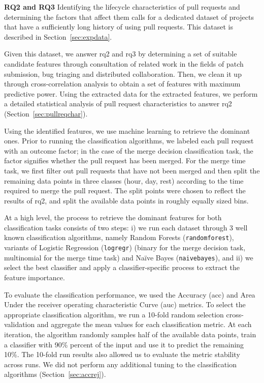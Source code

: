 \documentclass{sig-alternate}
\begin{document}
{\bfseries RQ2 and RQ3}
Identifying the lifecycle characteristics of pull requests and determining the
factors that affect them calls for a dedicated dataset of projects that have a
sufficiently long history of using pull requests. This dataset is described in
Section~\ref{sec:expdata}.

Given this dataset, we answer {\sc rq2} and {\sc rq3} by determining a set of
suitable candidate features through consultation of related work in the fields
of patch submission, bug triaging and distributed collaboration. Then, we clean
it up through cross-correlation analysis to obtain a set of features with
maximum predictive power. Using the extracted data for the extracted features,
we perform a detailed statistical analysis of pull request characteristics to
answer {\sc rq2} (Section~\ref{sec:pullreqchar}).

Using the identified features, we use machine learning to retrieve
the dominant ones. Prior to running the classification algorithms, we labeled
each pull request with an outcome factor; in the case of the \textsf{merge
decision} classification task, the factor signifies whether the pull request
has been merged. For the \textsf{merge time} task, we first filter out pull
requests that have not been merged and then split the remaining data points in
three classes (\textsf{hour}, \textsf{day}, \textsf{rest}) according to the time 
required to merge the pull request. The split points were chosen to reflect the
results of {\sc rq2}, and split the available data points in roughly
equally sized bins.

At a high level, the process to retrieve the dominant features for both
classification tasks consists of two steps: i) we run each dataset through 3
well known classification algorithms, namely Random Forests
(\texttt{randomforest}), variants of Logistic Regression (\texttt{logregr})
(binary for the \textsf{merge decision} task, multinomial for the \textsf{merge
time} task) and Na\"ive Bayes (\texttt{naivebayes}), and ii) we select the best
classifier and apply a classifier-specific process to extract the feature
importance. 

To evaluate the classification performance, we used the Accuracy ({\sc acc}) and
Area Under the receiver operating characteristic Curve ({\sc auc}) metrics. To
select the appropriate classification algorithm, we run a 10-fold random
selection cross-validation and aggregate the mean values for each classification
metric. At each iteration, the algorithm randomly samples half of the
available data points, train a classifier with 90\% percent of the input and
use it to predict the remaining 10\%. The 10-fold run results also allowed us to
evaluate the metric stability across runs. We did not perform any additional
tuning to the classification algorithms (Section~\ref{sec:accrej}).
\end{document}
